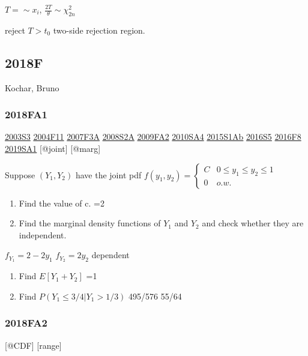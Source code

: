 \documentclass[6pt,twocolumn,Portrait]{article}
\begin{document}
\(T=\sim x_i\), \(\frac{2T}{\theta}\sim\chi^2_{2n}\)

reject \(T>t_0\) two-side rejection region.

\hypertarget{f-13}{%
\subsection{2018F}\label{f-13}}

Kochar, Bruno

\hypertarget{fa1-4}{%
\subsubsection{2018FA1}\label{fa1-4}}

\protect\hyperlink{s3}{2003S3} \protect\hyperlink{f11}{2004F11}
\protect\hyperlink{f3a}{2007F3A} \protect\hyperlink{s2a}{2008S2A}
\protect\hyperlink{fa2}{2009FA2} \protect\hyperlink{sa4-1}{2010SA4}
\protect\hyperlink{s1ab}{2015S1Ab} \protect\hyperlink{s5-4}{2016S5}
\protect\hyperlink{f8-4}{2016F8} \protect\hyperlink{sa1-3}{2019SA1}
{[}@joint{]} {[}@marg{]}

Suppose \((Y_1,Y_2)\) have the joint pdf
\(f(y_1,y_2)=\begin{cases}C&0\le y_1\le y_2\le 1\\0& o.w.\end{cases}\)

\begin{enumerate}
\def\labelenumi{(\alph{enumi})}
\item
  Find the value of c. =2
\item
  Find the marginal density functions of \(Y_1\) and \(Y_2\) and check
  whether they are independent.
\end{enumerate}

\(f_{Y_1}=2-2y_1\) \(f_{Y_2}=2y_2\) dependent

\begin{enumerate}
\def\labelenumi{(\alph{enumi})}
\setcounter{enumi}{2}
\item
  Find \(E[Y_1+Y_2]\) =1
\item
  Find \(P(Y_1\le3/4|Y_1>1/3)\) 495/576 55/64
\end{enumerate}

\hypertarget{fa2-4}{%
\subsubsection{2018FA2}\label{fa2-4}}

{[}@CDF{]} {[}range{]}
\end{document}
